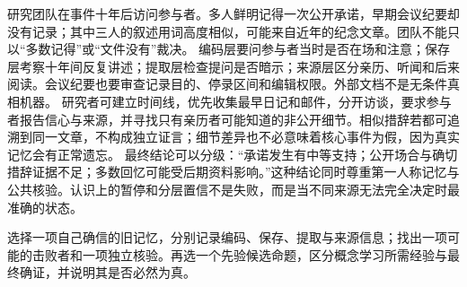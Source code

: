 研究团队在事件十年后访问参与者。多人鲜明记得一次公开承诺，早期会议纪要却没有记录；其中三人的叙述用词高度相似，可能来自近年的纪念文章。团队不能只以“多数记得”或“文件没有”裁决。 编码层要问参与者当时是否在场和注意；保存层考察十年间反复讲述；提取层检查提问是否暗示；来源层区分亲历、听闻和后来阅读。会议纪要也要审查记录目的、停录区间和编辑权限。外部文档不是无条件真相机器。 研究者可建立时间线，优先收集最早日记和邮件，分开访谈，要求参与者报告信心与来源，并寻找只有亲历者可能知道的非公开细节。相似措辞若都可追溯到同一文章，不构成独立证言；细节差异也不必意味着核心事件为假，因为真实记忆会有正常遗忘。 最终结论可以分级：“承诺发生有中等支持；公开场合与确切措辞证据不足；多数回忆可能受后期资料影响。”这种结论同时尊重第一人称记忆与公共核验。认识上的暂停和分层置信不是失败，而是当不同来源无法完全决定时最准确的状态。

\begin{tcolorbox}[breakable,colback=white,colframe=blue!30!black,title={本章研读任务},fonttitle=\bfseries]
选择一项自己确信的旧记忆，分别记录编码、保存、提取与来源信息；找出一项可能的击败者和一项独立核验。再选一个先验候选命题，区分概念学习所需经验与最终确证，并说明其是否必然为真。
\end{tcolorbox}
